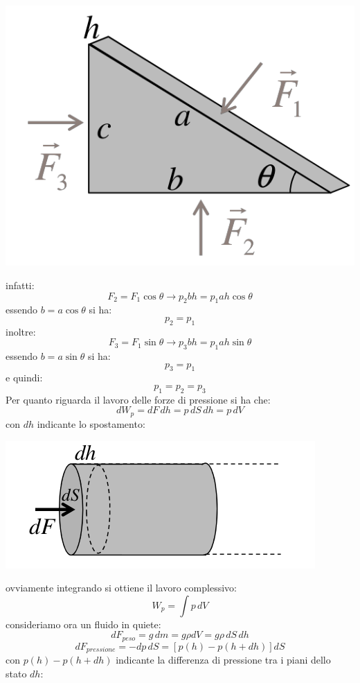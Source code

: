 \documentclass[a4paper,12pt, oneside]{book}
\begin{document}
\begin{center}
\includegraphics[scale=0.5]{img/flu.png}
\end{center}
infatti:
$$F_2=F_1\cos \theta\to p_2bh=p_1ah\cos\theta$$
essendo $b=a\cos\theta$ si ha:
$$p_2=p_1$$
inoltre:
$$F_3=F_1\sin \theta\to p_3bh=p_1ah\sin\theta$$
essendo $b=a\sin\theta$ si ha:
$$p_3=p_1$$
e quindi:
$$p_1=p_2=p_3$$
Per quanto riguarda il lavoro delle forze di pressione si ha che:
$$dW_p=dF\,dh=p\,dS\,dh=p\,dV$$
con $dh$ indicante lo spostamento:
\begin{center}
\includegraphics[scale=0.5]{img/flu2.png}
\end{center}
ovviamente integrando si ottiene il lavoro complessivo:
$$W_p=\int p\,dV$$
\newpage
consideriamo ora un fluido in quiete:
$$dF_{peso}=g\,dm=g\rho dV=g\rho \,dS\,dh$$
$$dF_{pressione}=-dp\,dS=[p(h)-p(h+dh)]dS$$
con $p(h)-p(h+dh)$ indicante la differenza di pressione tra i piani dello stato $dh$:
\end{document}
